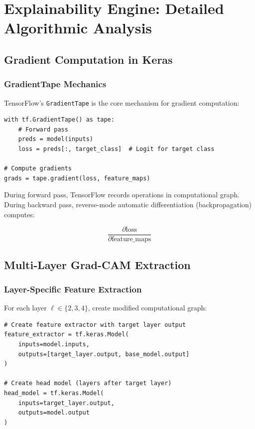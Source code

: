 \documentclass[12pt,a4paper,oneside]{book}
\begin{document}
\chapter{Explainability Engine: Detailed Algorithmic Analysis}
\label{ch:explainability}

\section{Gradient Computation in Keras}

\subsection{GradientTape Mechanics}

TensorFlow's \texttt{GradientTape} is the core mechanism for gradient computation:

\begin{lstlisting}
with tf.GradientTape() as tape:
    # Forward pass
    preds = model(inputs)
    loss = preds[:, target_class]  # Logit for target class

# Compute gradients
grads = tape.gradient(loss, feature_maps)
\end{lstlisting}

During forward pass, TensorFlow records operations in computational graph. During backward pass, reverse-mode automatic differentiation (backpropagation) computes:

\begin{equation}
\frac{\partial \text{loss}}{\partial \text{feature\_maps}}
\end{equation}

\section{Multi-Layer Grad-CAM Extraction}

\subsection{Layer-Specific Feature Extraction}

For each layer $\ell \in \{2, 3, 4\}$, create modified computational graph:

\begin{lstlisting}
# Create feature extractor with target layer output
feature_extractor = tf.keras.Model(
    inputs=model.inputs,
    outputs=[target_layer.output, base_model.output]
)

# Create head model (layers after target layer)
head_model = tf.keras.Model(
    inputs=target_layer.output,
    outputs=model.output
)
\end{lstlisting}
\end{document}
